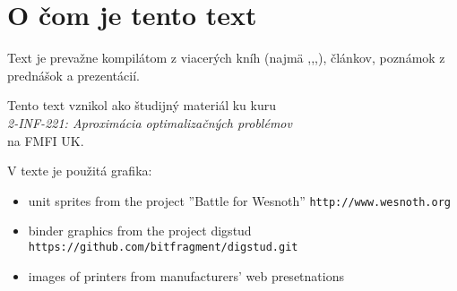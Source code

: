 \section*{O čom je tento text}

\noindent
Text je prevažne kompilátom z viacerých kníh (najmä \cite{GLS88},\cite{MG07},\cite{V04},\cite{WS11}),
článkov, poznámok z prednášok a prezentácií.


\vfill\noindent
Tento text vznikol ako študijný materiál ku kuru\\
{\em 2-INF-221: Aproximácia optimalizačných problémov} \\
na FMFI UK.


V texte je použitá grafika: \\
\begin{itemize}
  \item unit sprites from the project ''Battle for Wesnoth'' {\tt http://www.wesnoth.org}
  \item binder graphics from the project digstud {\tt https://github.com/bitfragment/digstud.git}
  \item images of printers from manufacturers' web presetnations
\end{itemize}

